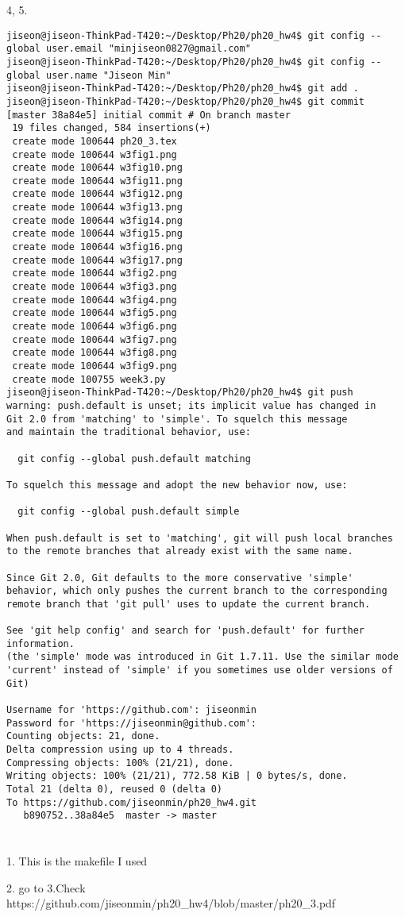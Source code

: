 \documentclass[10pt]{article}
\begin{document}
4, 5.
\begin{lstlisting}
jiseon@jiseon-ThinkPad-T420:~/Desktop/Ph20/ph20_hw4$ git config --global user.email "minjiseon0827@gmail.com"
jiseon@jiseon-ThinkPad-T420:~/Desktop/Ph20/ph20_hw4$ git config --global user.name "Jiseon Min"
jiseon@jiseon-ThinkPad-T420:~/Desktop/Ph20/ph20_hw4$ git add .
jiseon@jiseon-ThinkPad-T420:~/Desktop/Ph20/ph20_hw4$ git commit
[master 38a84e5] initial commit # On branch master
 19 files changed, 584 insertions(+)
 create mode 100644 ph20_3.tex
 create mode 100644 w3fig1.png
 create mode 100644 w3fig10.png
 create mode 100644 w3fig11.png
 create mode 100644 w3fig12.png
 create mode 100644 w3fig13.png
 create mode 100644 w3fig14.png
 create mode 100644 w3fig15.png
 create mode 100644 w3fig16.png
 create mode 100644 w3fig17.png
 create mode 100644 w3fig2.png
 create mode 100644 w3fig3.png
 create mode 100644 w3fig4.png
 create mode 100644 w3fig5.png
 create mode 100644 w3fig6.png
 create mode 100644 w3fig7.png
 create mode 100644 w3fig8.png
 create mode 100644 w3fig9.png
 create mode 100755 week3.py
jiseon@jiseon-ThinkPad-T420:~/Desktop/Ph20/ph20_hw4$ git push
warning: push.default is unset; its implicit value has changed in
Git 2.0 from 'matching' to 'simple'. To squelch this message
and maintain the traditional behavior, use:

  git config --global push.default matching

To squelch this message and adopt the new behavior now, use:

  git config --global push.default simple

When push.default is set to 'matching', git will push local branches
to the remote branches that already exist with the same name.

Since Git 2.0, Git defaults to the more conservative 'simple'
behavior, which only pushes the current branch to the corresponding
remote branch that 'git pull' uses to update the current branch.

See 'git help config' and search for 'push.default' for further information.
(the 'simple' mode was introduced in Git 1.7.11. Use the similar mode
'current' instead of 'simple' if you sometimes use older versions of Git)

Username for 'https://github.com': jiseonmin
Password for 'https://jiseonmin@github.com': 
Counting objects: 21, done.
Delta compression using up to 4 threads.
Compressing objects: 100% (21/21), done.
Writing objects: 100% (21/21), 772.58 KiB | 0 bytes/s, done.
Total 21 (delta 0), reused 0 (delta 0)
To https://github.com/jiseonmin/ph20_hw4.git
   b890752..38a84e5  master -> master
\end{lstlisting}




\section{}
1.
This is the makefile I used



2. go to
3.Check  https://github.com/jiseonmin/ph20_hw4/blob/master/ph20_3.pdf
\end{document}
